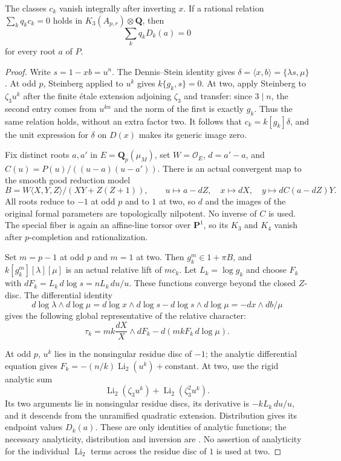 \begin{proposition}
\label{d3:prop:directtcendpoints}
The classes $c_k$ vanish integrally after inverting $x$.
If a rational relation $\sum_k q_kc_k=0$ holds in
$K_3(A_{p,r})\otimes\mathbf Q$, then
\[
       \sum_k q_kD_k(a)=0
\]
for every root $a$ of $P$.
\end{proposition}
\begin{proof}
Write $s=1-xb=u^n$. The Dennis--Stein identity gives
$\delta=\langle x,b\rangle=\{\lambda s,\mu\}$.
At odd $p$, Steinberg applied to $u^k$ gives $k\{g_k,s\}=0$.
At two, apply Steinberg to $\zeta_3u^k$ after the finite \'etale
extension adjoining $\zeta_3$ and transfer: since $3\mid n$, the
second entry comes from $u^{kn}$ and the norm of the first is exactly
$g_k$. Thus the same relation holds, without an extra factor two.
It follows that $c_k=k[g_k]\delta$, and the unit expression for
$\delta$ on $D(x)$ makes its generic image zero.

Fix distinct roots $a,a'$ in $E=\mathbf Q_p(\mu_M)$, set
$W=\mathcal O_E$, $d=a'-a$, and
$C(u)=P(u)/((u-a)(u-a'))$. There is an actual convergent map to the
smooth good reduction model
\[
 B=W\langle X,Y,Z\rangle/(XY+Z(Z+1)),\qquad
 u\mapsto a-dZ,\quad x\mapsto dX,\quad
 y\mapsto dC(a-dZ)Y.
\]
All roots reduce to $-1$ at odd $p$ and to $1$ at two, so $d$ and
the images of the original formal parameters are topologically
nilpotent. No inverse of $C$ is used. The special fiber is again an
affine-line torsor over $\mathbf P^1$, so its $K_3$ and $K_4$
vanish after $p$-completion and rationalization.

Set $m=p-1$ at odd $p$ and $m=1$ at two. Then $g_k^m\in1+\pi B$,
and $k[g_k^m][\lambda][\mu]$ is an actual relative lift of $mc_k$.
Let $L_k=\log g_k$ and choose $F_k$ with
$dF_k=L_k\,d\log s=nL_k\,du/u$. These functions converge beyond
the closed $Z$-disc. The differential identity
\[
 d\log\lambda\wedge d\log\mu
 =d\log x\wedge d\log s-d\log s\wedge d\log\mu
 =-dx\wedge db/\mu
\]
gives the following global representative of the relative character:
\[
 \tau_k=mk\frac{dX}{X}\wedge dF_k
                         -d(mkF_k\,d\log\mu).
\]

At odd $p$, $u^k$ lies in the nonsingular residue disc of $-1$;
the analytic differential equation gives
$F_k=-(n/k)\operatorname{Li}_2(u^k)+\mathrm{constant}$.
At two, use the rigid analytic sum
\[
 \operatorname{Li}_2(\zeta_3u^k)+
                   \operatorname{Li}_2(\zeta_3^2u^k).
\]
Its two arguments lie in nonsingular residue discs, its derivative is
$-kL_k\,du/u$, and it descends from the unramified quadratic
extension. Distribution gives its endpoint values $D_k(a)$.
These are only identities of analytic functions; the necessary
analyticity, distribution and inversion are
\cite[Theorem~2.7(1), Proposition~4.4, Proposition~2.10]{BesserDeJeuAlgorithm}.
No assertion of analyticity for the individual $\operatorname{Li}_2$
terms across the residue disc of $1$ is used at two.


\end{proof}

